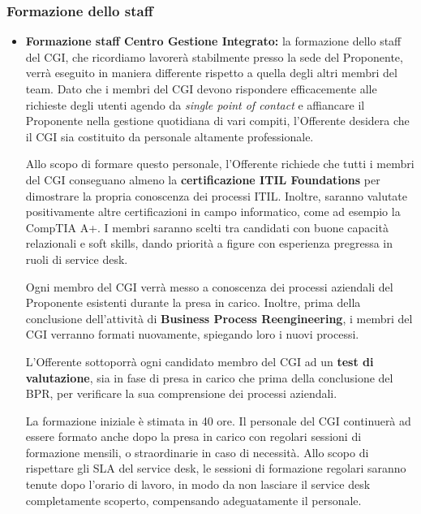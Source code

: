                 \subsubsection{Formazione dello staff}
                	\begin{itemize}
                		\item \textbf{Formazione staff Centro Gestione Integrato:} la formazione dello staff del CGI, che ricordiamo lavorerà stabilmente presso la sede del Proponente, verrà eseguito in maniera differente rispetto a quella degli altri membri del team. Dato che i membri del CGI devono rispondere efficacemente alle richieste degli utenti agendo da \textit{single point of contact} e affiancare il Proponente nella gestione quotidiana di vari compiti, l'Offerente desidera che il CGI sia costituito da personale altamente professionale. 
                        
                        
                        Allo scopo di formare questo personale, l'Offerente richiede che tutti i membri del CGI conseguano almeno la \textbf{certificazione ITIL Foundations} per dimostrare la propria conoscenza dei processi ITIL. Inoltre, saranno valutate positivamente altre certificazioni in campo informatico, come ad esempio la CompTIA A+. I membri saranno scelti tra candidati con buone capacità relazionali e soft skills, dando priorità a figure con esperienza pregressa in ruoli di service desk.
                        
                        
                        Ogni membro del CGI verrà messo a conoscenza dei processi aziendali del Proponente esistenti durante la presa in carico. Inoltre, prima della conclusione dell'attività di \textbf{Business Process Reengineering}, i membri del CGI verranno formati nuovamente, spiegando loro i nuovi processi.
                        
                        
                        L'Offerente sottoporrà ogni candidato membro del CGI ad un \textbf{test di valutazione}, sia in fase di presa in carico che prima della conclusione del BPR, per verificare la sua comprensione dei processi aziendali.
                        
                        
                        La formazione iniziale è stimata in 40 ore. Il personale del CGI continuerà ad essere formato anche dopo la presa in carico con regolari sessioni di formazione mensili, o straordinarie in caso di necessità. Allo scopo di rispettare gli SLA del service desk, le sessioni di formazione regolari saranno tenute dopo l'orario di lavoro, in modo da non lasciare il service desk completamente scoperto, compensando adeguatamente il personale.
                        

\end{itemize}

